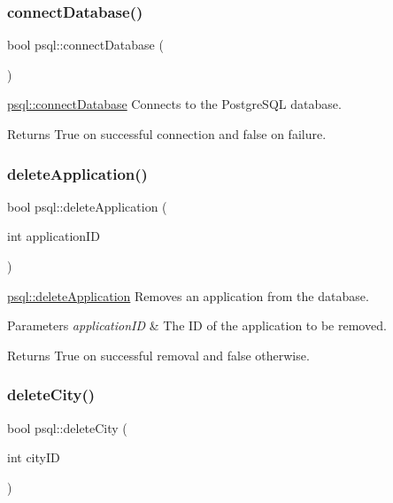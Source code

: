 \subsubsection{\texorpdfstring{connect\+Database()}{connectDatabase()}}
{\footnotesize\ttfamily bool psql\+::connect\+Database (\begin{DoxyParamCaption}{ }\end{DoxyParamCaption})}



\hyperlink{classpsql_ada485c933df77453629e3821ab19fa4c}{psql\+::connect\+Database} Connects to the Postgre\+S\+QL database. 

\begin{DoxyReturn}{Returns}
True on successful connection and false on failure. 
\end{DoxyReturn}
\mbox{\label{classpsql_a999ee8e2d813892411ef502ebc055a79}} 
\subsubsection{\texorpdfstring{delete\+Application()}{deleteApplication()}}
{\footnotesize\ttfamily bool psql\+::delete\+Application (\begin{DoxyParamCaption}\item[{int}]{application\+ID }\end{DoxyParamCaption})}



\hyperlink{classpsql_a999ee8e2d813892411ef502ebc055a79}{psql\+::delete\+Application} Removes an application from the database. 


\begin{DoxyParams}{Parameters}
{\em application\+ID} & The ID of the application to be removed. \\
\hline
\end{DoxyParams}
\begin{DoxyReturn}{Returns}
True on successful removal and false otherwise. 
\end{DoxyReturn}
\mbox{\label{classpsql_aaffd42b26b635d9881daaf5fbf4fd62f}} 
\subsubsection{\texorpdfstring{delete\+City()}{deleteCity()}}
{\footnotesize\ttfamily bool psql\+::delete\+City (\begin{DoxyParamCaption}\item[{int}]{city\+ID }\end{DoxyParamCaption})}



